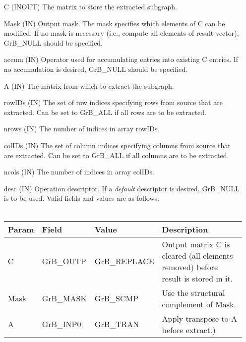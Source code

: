 \begin{itemize}[leftmargin=1in]
    \item[{\sf C}]     ({\sf INOUT}) The matrix to store the extracted subgraph.

    \item[{\sf Mask}]  ({\sf IN}) Output mask. The mask
    specifies which elements of {\sf C} can be modified.
    If no mask is necessary (i.e., compute all elements of result
    vector), {\sf GrB\_NULL} should be specified.

    \item[{\sf accum}]  ({\sf IN})  Operator used for accumulating entries into existing {\sf C} entries. 
			If no accumulation is desired, {\sf GrB\_NULL} should be specified.

    \item[{\sf A}]      ({\sf IN})  The matrix from which to extract the subgraph.
    \item[{\sf rowIDs}] ({\sf IN})     The set of row indices specifying rows from source that
                              are extracted. Can
                              be set to {\sf GrB\_ALL} if all rows are
                              to be extracted.
    \item[{\sf nrows}]  ({\sf IN}) The number of indices in array {\sf rowIDs}.
    \item[{\sf colIDs}] ({\sf IN}) The set of column indices specifying
                              columns from source that are extracted. Can
                              be set to {\sf GrB\_ALL} if all columns are
                              to be extracted.
    \item[{\sf ncols}]  ({\sf IN}) The number of indices in array {\sf colIDs}.

    \item[{\sf desc}]   ({\sf IN}) Operation descriptor. If a
    \emph{default} descriptor is desired, {\sf GrB\_NULL} is to be
    used.  Valid fields and values are as follows: \\ ~\\
    \begin{tabular}{lllp{2.5in}}
    Param & Field  & Value & Description \\
    \hline
    {\sf C}    & {\sf GrB\_OUTP} & {\sf GrB\_REPLACE} & Output matrix {\sf C} is cleared (all elements removed) before result is stored in it. \\
    {\sf Mask} & {\sf GrB\_MASK} & {\sf GrB\_SCMP}   & Use the structural complement of {\sf Mask}. \\
    {\sf A}    & {\sf GrB\_INP0} & {\sf GrB\_TRAN}   & Apply transpose to {\sf A} before extract.) \\
    \end{tabular}
\end{itemize}

